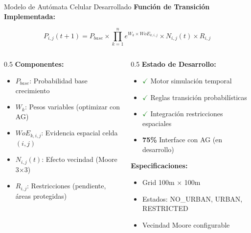 \documentclass[aspectratio=169]{beamer}
\begin{document}
\begin{frame}{Modelo de Autómata Celular Desarrollado}
  \textbf{Función de Transición Implementada:}
  
  $$P_{i,j}(t+1) = P_{base} \times \prod_{k=1}^{n} e^{W_k \times WoE_{k,i,j}} \times N_{i,j}(t) \times R_{i,j}$$
  
  \vspace{0.3cm}
  \begin{columns}
    \begin{column}{0.5\textwidth}
      \textbf{Componentes:}
      \begin{itemize}
        \item $P_{base}$: Probabilidad base crecimiento
        \item $W_k$: Pesos variables (optimizar con AG)
        \item $WoE_{k,i,j}$: Evidencia espacial celda $(i,j)$  
        \item $N_{i,j}(t)$: Efecto vecindad (Moore 3×3)
        \item $R_{i,j}$: Restricciones (pendiente, áreas protegidas)
      \end{itemize}
    \end{column}
    \begin{column}{0.5\textwidth}
      \textbf{Estado de Desarrollo:}
      \begin{itemize}
        \item \textcolor{ForestGreen}{\textbf{$\checkmark$}} Motor simulación temporal
        \item \textcolor{ForestGreen}{\textbf{$\checkmark$}} Reglas transición probabilísticas
        \item \textcolor{ForestGreen}{\textbf{$\checkmark$}} Integración restricciones espaciales
        \item \textcolor{UNAMBlue}{\textbf{75\%}} Interface con AG (en desarrollo)
      \end{itemize}
      
      \vspace{0.2cm}
      \textbf{Especificaciones:}
      \begin{itemize}
        \item Grid 100m × 100m
        \item Estados: NO\_URBAN, URBAN, RESTRICTED
        \item Vecindad Moore configurable
      \end{itemize}
    \end{column}
  \end{columns}
\end{frame}
\end{document}
